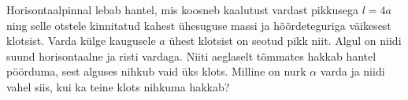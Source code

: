 \documentclass[a4paper,11pt,twocolumn]{article}
\begin{document}
\begin{question}[Lõppv 2015, G9][sta5][6cm]
	Horisontaalpinnal lebab hantel, mis koosneb kaalutust vardast pikkusega $ l = 4a $ ning selle otstele kinnitatud kahest ühesuguse massi ja hõõrdeteguriga väikesest klotsist. Varda külge kaugusele $ a $ ühest klotsist on seotud pikk niit. Algul on niidi suund horisontaalne ja risti vardaga. Niiti aeglaselt tõmmates hakkab hantel pöörduma, sest alguses nihkub vaid üks klots. Milline on nurk $ \alpha $ varda ja niidi vahel siis, kui ka teine klots nihkuma hakkab?
\end{question}
\end{document}
